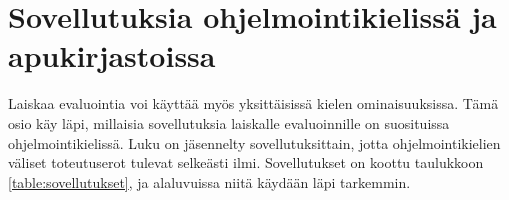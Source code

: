 
% 
% 
% 
%

\section{Sovellutuksia ohjelmointikielissä ja apukirjastoissa}\label{sovellutuksia}

Laiskaa evaluointia voi käyttää myös yksittäisissä kielen ominaisuuksissa. Tämä osio käy läpi, millaisia sovellutuksia laiskalle evaluoinnille on suosituissa ohjelmointikielissä. Luku on jäsennelty sovellutuksittain, jotta ohjelmointikielien väliset toteutuserot tulevat selkeästi ilmi. Sovellutukset on koottu taulukkoon \ref{table:sovellutukset}, ja alaluvuissa niitä käydään läpi tarkemmin.

